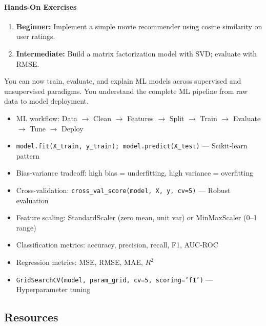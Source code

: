 \documentclass[11pt, a4paper, oneside]{report}
\begin{document}
\paragraph{Hands-On Exercises}
\begin{enumerate}[leftmargin=*]
\item \textbf{Beginner:} Implement a simple movie recommender using cosine similarity on user ratings.
\item \textbf{Intermediate:} Build a matrix factorization model with SVD; evaluate with RMSE.
\end{enumerate}

\begin{microcheckpoint}
You can now train, evaluate, and explain ML models across supervised and unsupervised paradigms. You understand the complete ML pipeline from raw data to model deployment.
\end{microcheckpoint}

\begin{cheatsheetbox}
\begin{itemize}[leftmargin=*]
\item ML workflow: Data $\to$ Clean $\to$ Features $\to$ Split $\to$ Train $\to$ Evaluate $\to$ Tune $\to$ Deploy
\item \texttt{model.fit(X\_train, y\_train); model.predict(X\_test)} --- Scikit-learn pattern
\item Bias-variance tradeoff: high bias = underfitting, high variance = overfitting
\item Cross-validation: \texttt{cross\_val\_score(model, X, y, cv=5)} --- Robust evaluation
\item Feature scaling: StandardScaler (zero mean, unit var) or MinMaxScaler (0--1 range)
\item Classification metrics: accuracy, precision, recall, F1, AUC-ROC
\item Regression metrics: MSE, RMSE, MAE, $R^2$
\item \texttt{GridSearchCV(model, param\_grid, cv=5, scoring='f1')} --- Hyperparameter tuning
\end{itemize}
\end{cheatsheetbox}

\subsection*{Resources}
\end{document}
